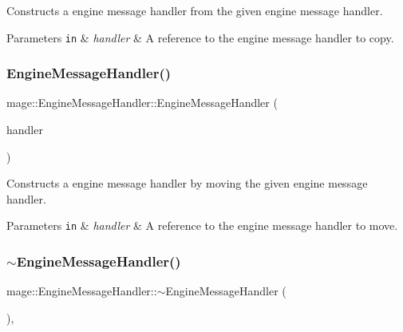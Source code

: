 Constructs a engine message handler from the given engine message handler.


\begin{DoxyParams}[1]{Parameters}
\mbox{\tt in}  & {\em handler} & A reference to the engine message handler to copy. \\
\hline
\end{DoxyParams}
\hypertarget{classmage_1_1_engine_message_handler_ab771829274e6ab899b4499926f504667}{}\label{classmage_1_1_engine_message_handler_ab771829274e6ab899b4499926f504667} 
\subsubsection{\texorpdfstring{Engine\+Message\+Handler()}{EngineMessageHandler()}\hspace{0.1cm}{\footnotesize\ttfamily [3/3]}}
{\footnotesize\ttfamily mage\+::\+Engine\+Message\+Handler\+::\+Engine\+Message\+Handler (\begin{DoxyParamCaption}\item[{\hyperlink{classmage_1_1_engine_message_handler}{Engine\+Message\+Handler} \&\&}]{handler }\end{DoxyParamCaption})\hspace{0.3cm}{\ttfamily [noexcept]}}

Constructs a engine message handler by moving the given engine message handler.


\begin{DoxyParams}[1]{Parameters}
\mbox{\tt in}  & {\em handler} & A reference to the engine message handler to move. \\
\hline
\end{DoxyParams}
\hypertarget{classmage_1_1_engine_message_handler_a458f16ad9f68ad1e908e4d275c383c2c}{}\label{classmage_1_1_engine_message_handler_a458f16ad9f68ad1e908e4d275c383c2c} 
\subsubsection{\texorpdfstring{$\sim$\+Engine\+Message\+Handler()}{~EngineMessageHandler()}}
{\footnotesize\ttfamily mage\+::\+Engine\+Message\+Handler\+::$\sim$\+Engine\+Message\+Handler (\begin{DoxyParamCaption}{ }\end{DoxyParamCaption})\hspace{0.3cm}{\ttfamily [virtual]}, {\ttfamily [default]}}

